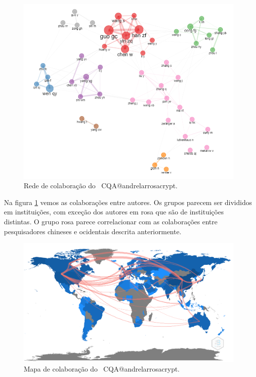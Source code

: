 \begin{figure}
    \centering
    \includegraphics[angle=0,width=1\textwidth]{experiments/andrelarrosacrypt/AnaliseBibliometrica/CriptografiaQuantica/imagens/CQA@andrelarrosacrypt_Colab.png}
    \caption{Rede de colaboração do \dataset\ CQA@andrelarrosacrypt.}
    \label{CQA@andrelarrosacrypt_Colab}
\end{figure}

Na figura \ref{CQA@andrelarrosacrypt_Colab} vemos as colaborações entre autores. Os grupos parecem ser divididos em instituições, com exceção dos autores em rosa que são de instituições distintas. O grupo rosa parece correlacionar com as colaborações entre pesquisadores chineses e ocidentais descrita anteriormente.

\begin{figure}
    \centering
    \includegraphics[angle=0,width=1\textwidth]{experiments/andrelarrosacrypt/AnaliseBibliometrica/CriptografiaQuantica/imagens/CQA@andrelarrosacrypt_ColabMap.png}
    \caption{Mapa de colaboração do \dataset\ CQA@andrelarrosacrypt.}
    \label{CQA@andrelarrosacrypt_ColabMap}
\end{figure}

